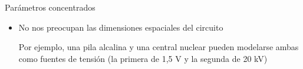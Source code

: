 \documentclass[aspectratio=169, xcolor={usenames,svgnames,dvipsnames}]{beamer}
\begin{document}

\begin{frame}{Parámetros concentrados}
    \begin{itemize}
        \item \alert{No nos preocupan las dimensiones espaciales} del circuito
        
        \vspace{3mm}
        Por ejemplo, una pila alcalina y una central nuclear pueden modelarse ambas como fuentes de tensión (la primera de 1,5 V y la segunda de 20 kV)
    \end{itemize}    


\end{frame}
\end{document}
